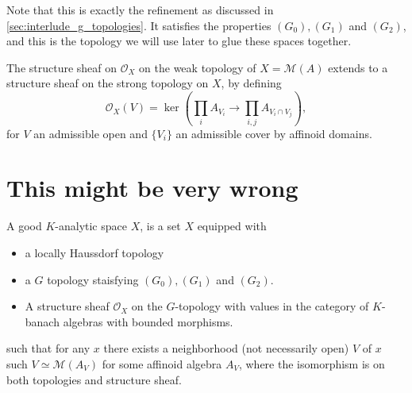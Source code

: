 Note that this is exactly the refinement as discussed in \cref{sec:interlude_g_topologies}. 
It satisfies the properties $(G_0), (G_1)$ and $(G_2)$, and this is the topology we will use later to glue these spaces together. 

\begin{proposition}
	The structure sheaf on $\mathcal{O}_X$ on the weak topology of $X = \mathcal{M} (A)$ extends to a structure sheaf on the strong topology on $X$, by defining \[
		\mathcal{O}_X(V) = \ker\left(\prod_{i} A_{V_i} \to \prod_{i,j} A_{V_i \cap V_j}\right)
	,\]
	for $V$ an admissible open and $\{V_i\} $ an admissible cover by affinoid domains. 
\end{proposition}

\section{This might be very wrong} \label{sec:this_might_be_very_wrong}

\begin{definition}
	A good $K$-analytic space $X$, is a set $X$ equipped with 
	\begin{itemize}
		\item a locally Haussdorf topology
		\item a $G$ topology staisfying $(G_0),(G_1)$ and $(G_2)$. 
		\item A structure sheaf $\mathcal{O}_X$ on the $G$-topology with values in the category of $K$-banach algebras with bounded morphisms.
	\end{itemize}
	such that for any $x$ there exists a neighborhood (not necessarily open) $V$ of $x$ such $V \simeq \mathcal{M} (A_V)$ for some affinoid algebra $A_V$, where the isomorphism is on both topologies and structure sheaf. 
\end{definition}


